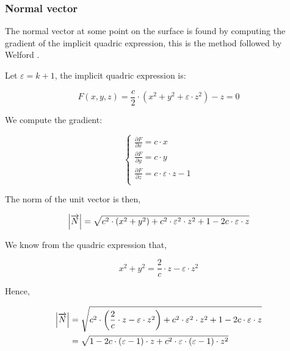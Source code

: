 \subsubsection{Normal vector}
The normal vector at some point on the surface is found by computing the
gradient of the implicit quadric expression, this is the method followed by
Welford \cite{Welford:1986}.

Let $\varepsilon = k+1$, the implicit quadric expression is:

\begin{equation}
F(x,y,z) = \frac{c}{2} \cdot (x^2 + y^2 + \varepsilon \cdot z^2) - z = 0
\end{equation}

We compute the gradient:

\begin{equation} \begin{cases}
\frac{\partial F}{\partial x} = c \cdot x\\
\frac{\partial F}{\partial y} = c \cdot y\\
\frac{\partial F}{\partial z} = c \cdot \varepsilon \cdot z - 1\\
\end{cases} \end{equation}

The norm of the unit vector is then,

\begin{equation}
\abs{\overrightarrow{N}} =
\sqrt{c^2 \cdot (x^2 + y^2) + c^2 \cdot \varepsilon^2
  \cdot z^2 + 1 - 2 c \cdot \varepsilon \cdot z} \\
\end{equation}

We know from the quadric expression that,

\begin{equation}
x^2 + y^2 = \frac{2}{c} \cdot z - \varepsilon \cdot z^2
\end{equation}

Hence,

\begin{equation} \begin{split}
\abs{\overrightarrow{N}} &=
\sqrt{c^2 \cdot \left( \frac{2}{c} \cdot z - \varepsilon \cdot z^2 \right)
  + c^2 \cdot \varepsilon^2 \cdot z^2 + 1 - 2 c \cdot \varepsilon \cdot z} \\
&= \sqrt{1 - 2 c \cdot (\varepsilon - 1) \cdot z + c^2 \cdot \varepsilon \cdot
         (\varepsilon - 1) \cdot z^2}
\end{split} \end{equation}

